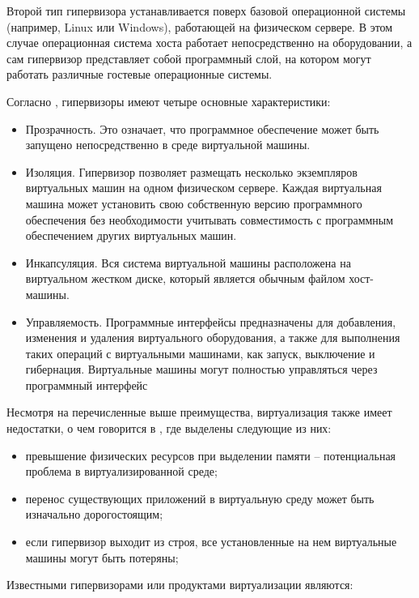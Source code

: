 Второй тип гипервизора устанавливается поверх базовой операционной системы (например, Linux или Windows), работающей на физическом сервере. В этом случае операционная система хоста работает непосредственно на оборудовании, а сам гипервизор представляет собой программный слой, на котором могут работать различные гостевые операционные системы.

Согласно \cite{huai2007civic}, гипервизоры имеют четыре основные характеристики:

\begin{itemize}
    \item Прозрачность. Это означает, что программное обеспечение может быть запущено непосредственно в среде виртуальной машины.
    \item Изоляция. Гипервизор позволяет размещать несколько экземпляров виртуальных машин на одном физическом сервере. Каждая виртуальная машина может установить свою собственную версию программного обеспечения без необходимости учитывать совместимость с программным обеспечением других виртуальных машин.
    \item Инкапсуляция. Вся система виртуальной машины расположена на виртуальном жестком диске, который является обычным файлом хост-машины.
    \item Управляемость. Программные интерфейсы предназначены для добавления, изменения и удаления виртуального оборудования, а также для выполнения таких операций с виртуальными машинами, как запуск, выключение и гибернация. Виртуальные машины могут полностью управляться через программный интерфейс
\end{itemize}

Несмотря на перечисленные выше преимущества, виртуализация также имеет недостатки, о чем говорится в \cite{daniels2009server}, где выделены следующие из них:

\begin{itemize}
    \item превышение физических ресурсов при выделении памяти – потенциальная проблема в виртуализированной среде; 
    \item перенос существующих приложений в виртуальную среду может быть изначально дорогостоящим; 
    \item если гипервизор выходит из строя, все установленные на нем виртуальные машины могут быть потеряны; 
\end{itemize}

Известными гипервизорами или продуктами виртуализации являются:

